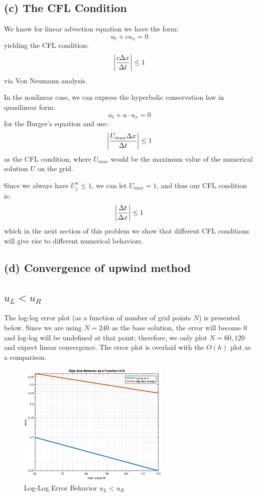 \documentclass[12pt]{article} %
\begin{document}
\subsection{(c) The CFL Condition}
We know for linear advection equation we have the form:
$$
	u_t + cu_x = 0
$$ yielding the CFL condition:
$$
	\abs{\frac{c\Delta x}{\Delta t}} \le 1
$$ via Von Neumann analysis.

In the nonlinear case, we can express the hyperbolic conservation law in quasilinear form:
$$
	u_t + u\cdot u_x = 0
$$ for the Burger's equation and use:
$$
	\abs{\frac{U_{max}\Delta x}{\Delta t}}\le 1
$$ as the CFL condition, where $U_{max}$ would be the maximum value of the numerical solution $U$ on the grid.

Since we always have $U_{j}^{n} \le 1$, we can let $U_{max} = 1$, and thus our CFL condition is:
$$
	\abs{\frac{\Delta t}{\Delta x}} \le 1
$$ which in the next section of this problem we show that different CFL conditions will give rise to different numerical behaviors.
\subsection{(d) Convergence of upwind method}
\subsection{$u_L < u_R$}
The log-log error plot (as a function of number of grid points $N$) is presented below. Since we are using $N = 240$ as the base solution, the error will become $0$ and log-log will be undefined at that point; therefore, we only plot $N=60,120$ and expect linear convergence. The error plot is overlaid with the $O(h)$ plot as a comparison.

\begin{figure}[h]
\caption{Log-Log Error Behavior $u_L<u_R$}
\centering
\includegraphics[width=0.65\textwidth]{1d_loglog.eps}
\end{figure}
\end{document}
